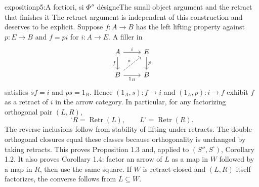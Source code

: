 \begin{dcomment}{exposition}{p5:A fortiori, si $\Phi''$ désigne}{The small object argument and the retract that finishes it}
The retract argument is independent of this construction and deserves to be explicit. Suppose $f:A\to B$ has the left lifting property against $p:E\to B$ and $f=pi$ for $i:A\to E$. A filler in
\[
\begin{tikzcd}
A\arrow[r,"i"]\arrow[d,"f"'] & E\arrow[d,"p"]\\
B\arrow[r,"1_B"']\arrow[ur,dashed,"s"] & B
\end{tikzcd}
\]
satisfies $sf=i$ and $ps=1_B$. Hence $(1_A,s):f\to i$ and $(1_A,p):i\to f$ exhibit $f$ as a retract of $i$ in the arrow category. In particular, for any factorizing orthogonal pair $(L,R)$,
\[
{}^{\square}R=\operatorname{Retr}(L),\qquad
L^{\square}=\operatorname{Retr}(R).
\]
The reverse inclusions follow from stability of lifting under retracts. The double-orthogonal closures equal these classes because orthogonality is unchanged by taking retracts. This proves Proposition 1.3 and, applied to $(S'',S^{\square})$, Corollary 1.2. It also proves Corollary 1.4: factor an arrow of $L$ as a map in $W$ followed by a map in $R$, then use the same square. If $W$ is retract-closed and $(L,R)$ itself factorizes, the converse follows from $L\subseteq W$.
\end{dcomment}

